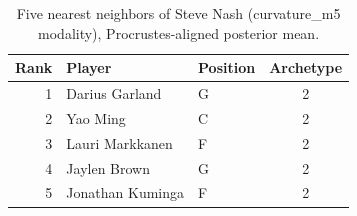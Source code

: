 \begin{table}[htbp]
  \centering\small
  \begin{tabular}{rllc}
    \toprule
    Rank & Player & Position & Archetype \\
    \midrule
    1 & Darius Garland & G & 2 \\
    2 & Yao Ming & C & 2 \\
    3 & Lauri Markkanen & F & 2 \\
    4 & Jaylen Brown & G & 2 \\
    5 & Jonathan Kuminga & F & 2 \\
    \bottomrule
  \end{tabular}
  \caption{Five nearest neighbors of Steve Nash (curvature_m5 modality), Procrustes-aligned posterior mean.}
  \label{tab:Steve_Nash_neighbors_curvature_m5}
\end{table}

